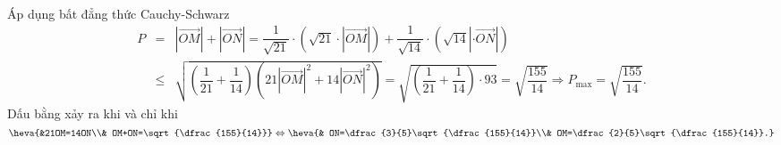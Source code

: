 \begin{vd}
{\begin{eqnarray*}
		\end{eqnarray*}
		Áp dụng bất đẳng thức Cauchy-Schwarz
		\begin{eqnarray*}
			P&=&\left|\overrightarrow{OM}\right|+\left|\overrightarrow{ON}\right|=\dfrac{1}{\sqrt{21}}\cdot\left(\sqrt{21}\cdot \left|\overrightarrow{OM}\right|\right)+\dfrac{1}{\sqrt{14}}\cdot\left(\sqrt{14} \left|\cdot\overrightarrow{ON}\right|\right)
			\\&\leq &\sqrt{\left(\dfrac{1}{21}+\dfrac{1}{14}\right)\left( 21\left|\overrightarrow{OM}\right|^2+14\left|\overrightarrow{ON}\right|^2\right)}=\sqrt{\left(\dfrac{1}{21}+\dfrac{1}{14}\right)\cdot 93}=\sqrt{\dfrac{155}{14}}
			\Rightarrow P_{\max}=\sqrt{\dfrac{155}{14}}.
		\end{eqnarray*}
		Dấu bằng xảy ra khi và chỉ khi $\heva{&21OM=14ON\\& OM+ON=\sqrt{\dfrac{155}{14}}}\Leftrightarrow\heva{& ON=\dfrac{3}{5}\sqrt{\dfrac{155}{14}}\\& OM=\dfrac{2}{5}\sqrt{\dfrac{155}{14}}.}$
	}
\end{vd}

